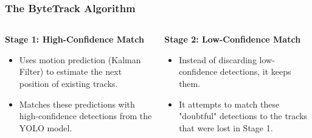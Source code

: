 \documentclass[serif]{beamer}  %
\begin{document}
\begin{frame}
    \frametitle{The ByteTrack Algorithm}
    
    \begin{columns}[T]
        \begin{column}{0.5\textwidth}
            \textbf{Stage 1: High-Confidence Match}
            \begin{itemize}
                \item Uses motion prediction (Kalman Filter) to estimate the next position of existing tracks.
                \item Matches these predictions with high-confidence detections from the YOLO model.
            \end{itemize}
        \end{column}
        
        \begin{column}{0.5\textwidth}
            \textbf{Stage 2: Low-Confidence Match}
            \begin{itemize}
                \item Instead of discarding low-confidence detections, it keeps them.
                \item It attempts to match these "doubtful" detections to the tracks that were lost in Stage 1.
            \end{itemize}
        \end{column}
    \end{columns}
    
\end{frame}
\end{document}
